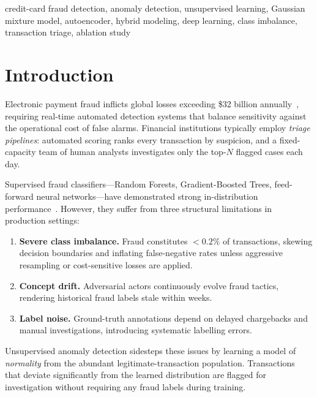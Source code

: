 \documentclass[conference,10pt]{IEEEtran}
\begin{document}
\begin{IEEEkeywords}
credit-card fraud detection, anomaly detection, unsupervised learning,
Gaussian mixture model, autoencoder, hybrid modeling, deep learning,
class imbalance, transaction triage, ablation study
\end{IEEEkeywords}

\section{Introduction}
\label{sec:intro}

Electronic payment fraud inflicts global losses exceeding \$32 billion
annually~\cite{nilson2023}, requiring real-time automated detection systems
that balance sensitivity against the operational cost of false alarms.
Financial institutions typically employ \emph{triage pipelines}: automated
scoring ranks every transaction by suspicion, and a fixed-capacity team of
human analysts investigates only the top-$N$ flagged cases each day.

Supervised fraud classifiers---Random Forests, Gradient-Boosted Trees,
feed-forward neural networks---have demonstrated strong in-distribution
performance~\cite{he2009}.  However, they suffer from three structural
limitations in production settings:

\begin{enumerate}[leftmargin=*]
\item \textbf{Severe class imbalance.}  Fraud constitutes $<\!0.2\%$ of
      transactions, skewing decision boundaries and inflating false-negative
      rates unless aggressive resampling or cost-sensitive losses are applied.
\item \textbf{Concept drift.}  Adversarial actors continuously evolve fraud
      tactics, rendering historical fraud labels stale within weeks.
\item \textbf{Label noise.}  Ground-truth annotations depend on delayed
      chargebacks and manual investigations, introducing systematic labelling
      errors.
\end{enumerate}

Unsupervised anomaly detection sidesteps these issues by learning a model of
\emph{normality} from the abundant legitimate-transaction population.
Transactions that deviate significantly from the learned distribution are
flagged for investigation without requiring any fraud labels during training.
\end{document}
